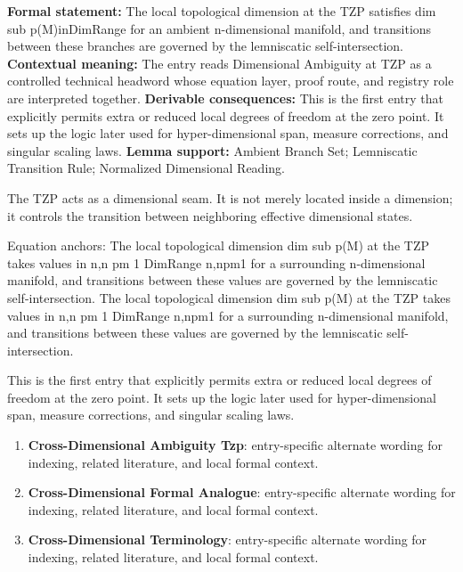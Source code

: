 \begingroup\footnotesize\setlength{\emergencystretch}{3em}\sloppy
\textbf{Formal statement:} The local topological dimension at the TZP satisfies dim sub p(M)inDimRange for an ambient n-dimensional manifold, and transitions between these branches are governed by the lemniscatic self-intersection. \textbf{Contextual meaning:} The entry reads Dimensional Ambiguity at TZP as a controlled technical headword whose equation layer, proof route, and registry role are interpreted together. \textbf{Derivable consequences:} This is the first entry that explicitly permits extra or reduced local degrees of freedom at the zero point. It sets up the logic later used for hyper-dimensional span, measure corrections, and singular scaling laws. \textbf{Lemma support:} Ambient Branch Set; Lemniscatic Transition Rule; Normalized Dimensional Reading.\par
\endgroup

The TZP acts as a dimensional seam. It is not merely located inside a dimension; it controls the transition between neighboring effective dimensional states.

Equation anchors: The local topological dimension dim sub p(M) at the TZP takes values in n,n pm 1 DimRange n,npm1 for a surrounding n-dimensional manifold, and transitions between these values are governed by the lemniscatic self-intersection. The local topological dimension dim sub p(M) at the TZP takes values in n,n pm 1 DimRange n,npm1 for a surrounding n-dimensional manifold, and transitions between these values are governed by the lemniscatic self-intersection.

This is the first entry that explicitly permits extra or reduced local degrees of freedom at the zero point. It sets up the logic later used for hyper-dimensional span, measure corrections, and singular scaling laws.
\endgroup

\begingroup\footnotesize\sloppy
\begin{enumerate}[leftmargin=1.35em,itemsep=1pt,topsep=1pt,parsep=0pt]
\item \textbf{Cross-Dimensional Ambiguity Tzp}: entry-specific alternate wording for indexing, related literature, and local formal context.
\item \textbf{Cross-Dimensional Formal Analogue}: entry-specific alternate wording for indexing, related literature, and local formal context.
\item \textbf{Cross-Dimensional Terminology}: entry-specific alternate wording for indexing, related literature, and local formal context.
\end{enumerate}
\endgroup

